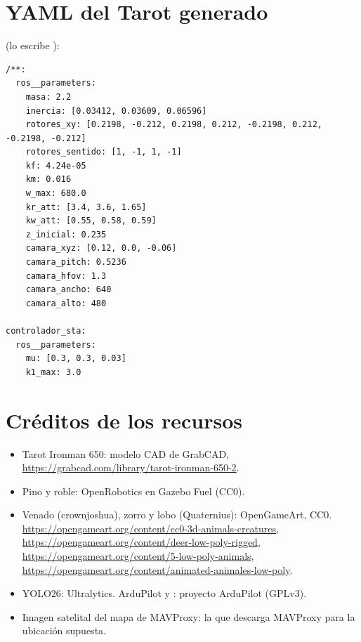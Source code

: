 \chapter{YAML del Tarot generado}

 (lo escribe ):
\begin{lstlisting}
/**:
  ros__parameters:
    masa: 2.2
    inercia: [0.03412, 0.03609, 0.06596]
    rotores_xy: [0.2198, -0.212, 0.2198, 0.212, -0.2198, 0.212, -0.2198, -0.212]
    rotores_sentido: [1, -1, 1, -1]
    kf: 4.24e-05
    km: 0.016
    w_max: 680.0
    kr_att: [3.4, 3.6, 1.65]
    kw_att: [0.55, 0.58, 0.59]
    z_inicial: 0.235
    camara_xyz: [0.12, 0.0, -0.06]
    camara_pitch: 0.5236
    camara_hfov: 1.3
    camara_ancho: 640
    camara_alto: 480

controlador_sta:
  ros__parameters:
    mu: [0.3, 0.3, 0.03]
    k1_max: 3.0
\end{lstlisting}

\chapter{Créditos de los recursos}

\begin{itemize}
  \item Tarot Ironman 650: modelo CAD de GrabCAD,
        \url{https://grabcad.com/library/tarot-ironman-650-2}.
  \item Pino y roble: OpenRobotics en Gazebo Fuel (CC0).
  \item Venado (crownjoshua), zorro y lobo (Quaternius): OpenGameArt, CC0.
        \url{https://opengameart.org/content/cc0-3d-animals-creatures},
        \url{https://opengameart.org/content/deer-low-poly-rigged},
        \url{https://opengameart.org/content/5-low-poly-animals},
        \url{https://opengameart.org/content/animated-animales-low-poly}.
  \item YOLO26: Ultralytics. ArduPilot y : proyecto ArduPilot (GPLv3).
  \item Imagen satelital del mapa de MAVProxy: la que descarga MAVProxy para la ubicación
        supuesta.
\end{itemize}

